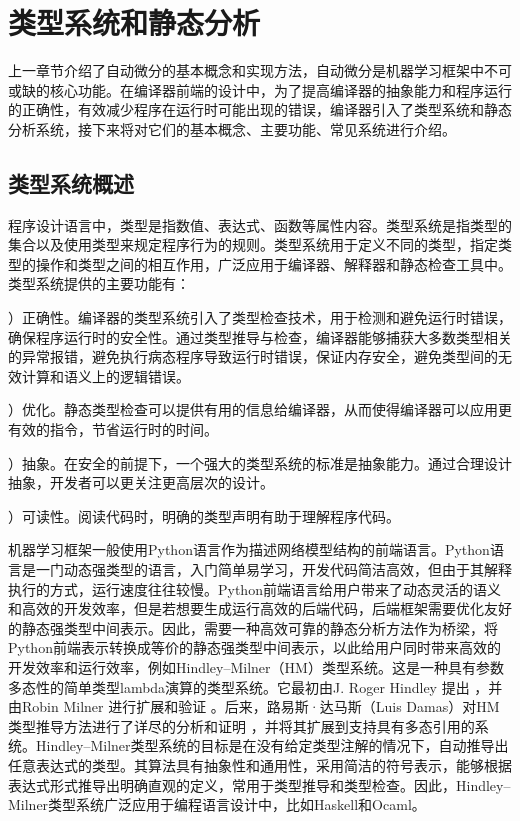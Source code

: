 \documentclass[letterpaper,10pt,english]{sphinxmanual}
\begin{document}
\section{类型系统和静态分析}
\label{\detokenize{chapter_frontend_and_ir/type_system_and_static_analysis:id1}}\label{\detokenize{chapter_frontend_and_ir/type_system_and_static_analysis::doc}}
\sphinxAtStartPar
上一章节介绍了自动微分的基本概念和实现方法，自动微分是机器学习框架中不可或缺的核心功能。在编译器前端的设计中，为了提高编译器的抽象能力和程序运行的正确性，有效减少程序在运行时可能出现的错误，编译器引入了类型系统和静态分析系统，接下来将对它们的基本概念、主要功能、常见系统进行介绍。


\subsection{类型系统概述}
\label{\detokenize{chapter_frontend_and_ir/type_system_and_static_analysis:id2}}
\sphinxAtStartPar
程序设计语言中，类型是指数值、表达式、函数等属性内容。类型系统是指类型的集合以及使用类型来规定程序行为的规则。类型系统用于定义不同的类型，指定类型的操作和类型之间的相互作用，广泛应用于编译器、解释器和静态检查工具中。类型系统提供的主要功能有：

）正确性。编译器的类型系统引入了类型检查技术，用于检测和避免运行时错误，确保程序运行时的安全性。通过类型推导与检查，编译器能够捕获大多数类型相关的异常报错，避免执行病态程序导致运行时错误，保证内存安全，避免类型间的无效计算和语义上的逻辑错误。

）优化。静态类型检查可以提供有用的信息给编译器，从而使得编译器可以应用更有效的指令，节省运行时的时间。

）抽象。在安全的前提下，一个强大的类型系统的标准是抽象能力。通过合理设计抽象，开发者可以更关注更高层次的设计。

）可读性。阅读代码时，明确的类型声明有助于理解程序代码。

\sphinxAtStartPar
机器学习框架一般使用Python语言作为描述网络模型结构的前端语言。Python语言是一门动态强类型的语言，入门简单易学习，开发代码简洁高效，但由于其解释执行的方式，运行速度往往较慢。Python前端语言给用户带来了动态灵活的语义和高效的开发效率，但是若想要生成运行高效的后端代码，后端框架需要优化友好的静态强类型中间表示。因此，需要一种高效可靠的静态分析方法作为桥梁，将Python前端表示转换成等价的静态强类型中间表示，以此给用户同时带来高效的开发效率和运行效率，例如Hindley–Milner（HM）类型系统。这是一种具有参数多态性的简单类型lambda演算的类型系统。它最初由J.
Roger Hindley 提出 ，并由Robin Milner 进行扩展和验证
 。后来，路易斯·达马斯（Luis
Damas）对HM类型推导方法进行了详尽的分析和证明
，并将其扩展到支持具有多态引用的系统。Hindley–Milner类型系统的目标是在没有给定类型注解的情况下，自动推导出任意表达式的类型。其算法具有抽象性和通用性，采用简洁的符号表示，能够根据表达式形式推导出明确直观的定义，常用于类型推导和类型检查。因此，Hindley–Milner类型系统广泛应用于编程语言设计中，比如Haskell和Ocaml。
\end{document}
